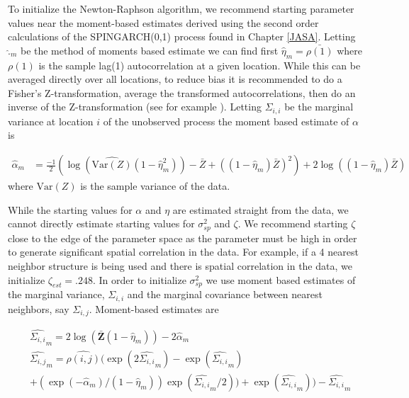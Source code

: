 \documentclass[11pt]{isuthesis}
\begin{document}
	To initialize the Newton-Raphson algorithm, we recommend starting parameter values near the moment-based estimates derived using the second order calculations of the SPINGARCH(0,1) process found in Chapter \ref{JASA}.  Letting $\widehat{.}_m$ be the method of moments based estimate we can find first $\widehat{\eta}_m=\bar{\rho(1)}$ where $\rho(1)$ is the sample lag(1) autocorrelation at a given location.  While this can be averaged directly over all locations, to reduce bias it is recommended to do a Fisher's Z-transformation, average the transformed autocorrelations, then do an inverse of the Z-transformation (see for example \cite{silver1987averaging}).  Letting $\Sigma_{i,i}$ be the marginal variance at location $i$ of the unobserved process the moment based estimate of $\alpha$ is

	\begin{align}
		\widehat{\alpha}_m & = \frac{-1}{2}\left(\log\left(\widehat{\mbox{Var}(Z)}(1-\widehat{\eta}_m^2)\right)-\bar{Z}+((1-\widehat{\eta}_m)\bar{Z})^2\right)+2\log\left((1-\widehat{\eta}_m)\bar{Z}\right)
		 \label{eq:alphamom}
	\end{align}
	 where $\widehat{\mbox{Var}(Z)}$ is the sample variance of the data.
	 
	 While the starting values for $\alpha$ and $\eta$ are estimated straight from the data, we cannot directly estimate starting values for $\sigma_{sp}^2$ and $\zeta$.  We recommend starting $\zeta$ close to the edge of the parameter space as the parameter must be high in order to generate significant spatial correlation in the data.  For example, if a 4 nearest neighbor structure is being used and there is spatial correlation in the data, we initialize $\zeta_{est}=.248$.  In order to initialize $\sigma^2_{sp}$ we use moment based estimates of the marginal variance, $\Sigma_{i,i}$ and the marginal covariance between nearest neighbors, say $\Sigma_{i,j}$.  Moment-based estimates are

	\begin{align}
		& \widehat{\Sigma_{i,i}}_m = 2\log(\bar{\boldsymbol{Z}}(1-\widehat{\eta}_m))-2\widehat{\alpha}_m\\
		& \widehat{\Sigma_{i,j}}_m = \widehat{\rho(i,j)}(\exp(2\widehat{\Sigma_{i,i}}_m)-\exp(\widehat{\Sigma_{i,i}}_m)\nonumber \\
		&+(\exp(-\widehat{\alpha}_m)/(1-\widehat{\eta}_m))\exp(\widehat{\Sigma_{i,i}}_m/2))+\exp(\widehat{\Sigma_{i,i}}_m))-\widehat{\Sigma_{i,i}}_m \label{eq:sigmamom}
	\end{align}
\end{document}
